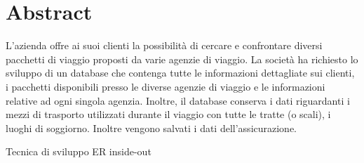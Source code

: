 \section{Abstract}
L'azienda \company offre ai suoi clienti la possibilità di cercare e confrontare diversi pacchetti di viaggio proposti da varie agenzie di viaggio. La società ha richiesto lo sviluppo di un database che contenga tutte le informazioni dettagliate sui clienti, i pacchetti disponibili presso le diverse agenzie di viaggio e le informazioni relative ad ogni singola agenzia. Inoltre, il database conserva i dati riguardanti i mezzi di trasporto utilizzati durante il viaggio con tutte le tratte (o scali), i luoghi di soggiorno. Inoltre vengono salvati i dati dell'assicurazione.

Tecnica di sviluppo ER inside-out